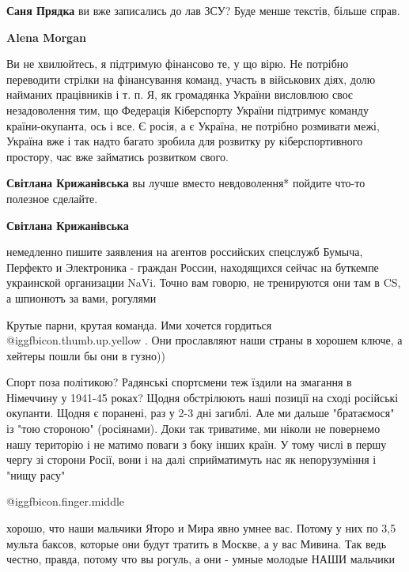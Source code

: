 \begin{itemize}
\begin{itemize}
\begin{itemize}
\textbf{Саня Прядка} ви вже записались до лав ЗСУ?
Буде менше текстів, більше справ.

\textbf{Alena Morgan} 

Ви не хвилюйтесь, я підтримую фінансово те, у що вірю. Не потрібно переводити
стрілки на фінансування команд, участь в військових діях, долю найманих
працівників і т. п. Я, як громадянка України висловлюю своє незадоволення тим,
що Федерація Кіберспорту України підтримує команду країни-окупанта, ось і все.
Є росія, а є Україна, не потрібно розмивати межі, Україна вже і так надто
багато зробила для розвитку ру кіберспортивного простору, час вже займатись
розвитком свого.

\textbf{Світлана Крижанівська} вы лучше вместо невдоволення* пойдите что-то полезное сделайте.

\textbf{Світлана Крижанівська} 

немедленно пишите заявления на агентов российских спецслужб Бумыча, Перфекто и
Электроника - граждан России, находящихся сейчас на буткемпе украинской
организации NaVi. Точно вам говорю, не тренируются они там в CS, а шпионютъ за
вами, рогулями

\end{itemize} %


Крутые парни, крутая команда. Ими хочется гордиться
@igg{fbicon.thumb.up.yellow} . Они прославляют наши страны в
хорошем ключе, а хейтеры пошли бы они в гузно))


\obeycr
Спорт поза політикою?
Радянські спортсмени теж їздили на змагання в Німеччину у 1941-45 роках?
Щодня обстрілюють наші позиції на сході російські окупанти.
Щодня є поранені, раз у 2-3 дні загиблі.
Але ми дальше "братаємося" із "тою стороною" (росіянами).
Доки так триватиме, ми ніколи не повернемо нашу територію і не матимо поваги з боку інших країн.
У тому числі в першу чергу зі сторони Росії, вони і на далі сприйматимуть нас як непорузуміння і "нищу расу"
\restorecr

\begin{itemize} %
 @igg{fbicon.finger.middle} 


хорошо, что наши мальчики Яторо и Мира явно умнее вас. Потому у них по 3,5
мульта баксов, которые они будут тратить в Москве, а у вас Мивина. Так ведь
честно, правда, потому что вы рогуль, а они - умные молодые НАШИ мальчики


\end{itemize}
\end{itemize}
\end{itemize}

